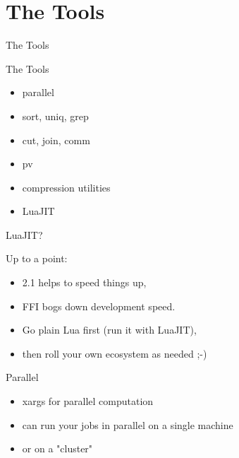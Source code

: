 \documentclass[handout]{beamer}
\begin{document}

\section{The Tools}


\begin{frame}
\huge The Tools
\end{frame}


\begin{frame}{The Tools}

\begin{itemize}
\item parallel
\item sort, uniq, grep
\item cut, join, comm
\item pv
\item compression utilities
\item LuaJIT
\end{itemize}

\end{frame}


\begin{frame}{LuaJIT?}

Up to a point:
\begin{itemize}
\item 2.1 helps to speed things up,
\item FFI bogs down development speed.
\item Go plain Lua first (run it with LuaJIT),
\item then roll your own ecosystem as needed ;-)
\end{itemize}

\end{frame}


\begin{frame}{Parallel}

\begin{itemize}
\item xargs for parallel computation
\item can run your jobs in parallel on a single machine
\item or on a "cluster"
\end{itemize}

\end{frame}
\end{document}
